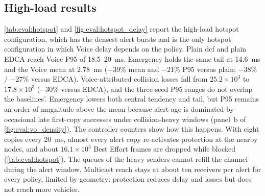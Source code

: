 \subsection{High-load results}
\label{sec:eval:hotspot:high}

\autoref{tab:eval:hotspot} and \autoref{fig:eval:hotspot_delay} report the high-load hotspot configuration, which has the densest alert bursts and is the only hotspot configuration in which Voice delay depends on the policy.
Plain \gls{dcf} and plain EDCA reach Voice P95 of 18.5--20~ms.
Emergency holds the same tail at 14.6~ms and the Voice mean at 2.78~ms ($-39\%$ mean and $-21\%$ P95 versus plain; $-38\%$ / $-27\%$ versus EDCA).
Voice-attributed collision losses fall from $25.2\times10^{3}$ to $17.8\times10^{3}$ ($-30\%$ versus EDCA), and the three-seed P95 ranges do not overlap the baselines'.
Emergency lowers both central tendency and tail, but P95 remains an order of magnitude above the mean because alert age is dominated by occasional late first-copy successes under collision-heavy windows (panel~b of \autoref{fig:eval:vo_density}).
The controller counters show how this happens.
With eight copies every 20~ms, almost every alert copy re-activates protection at the nearby nodes, and about $16.1\times10^{3}$ Best Effort frames are dropped while blocked (\autoref{tab:eval:hotspot}).
The queues of the heavy senders cannot refill the channel during the alert window.
Multicast reach stays at about ten receivers per alert for every policy, limited by geometry: protection reduces delay and losses but does not reach more vehicles.

